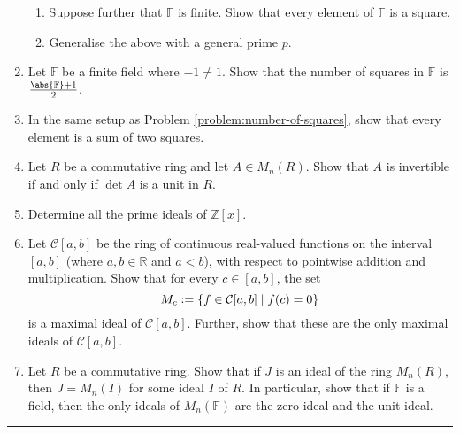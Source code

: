 \begin{enumerate}
\begin{enumerate}
        \item Suppose further that $\mathbb{F}$ is finite. Show that every element of $\mathbb{F}$ is a square.
        \item Generalise the above with a general prime $p$.
    \end{enumerate}
    \item \label{problem:number-of-squares}Let $\mathbb{F}$ be a finite field where $-1 \neq 1$. Show that the number of squares in $\mathbb{F}$ is $\frac{\abs{\mathbb{F}}+1}{2}$.
    \item In the same setup as Problem \ref{problem:number-of-squares}, show that every element is a sum of two squares.
    \item Let $R$ be a commutative ring and let $A \in M_n(R)$. Show that $A$ is invertible if and only if $\det A$ is a unit in $R$.
    \item Determine all the prime ideals of $\mathbb{Z}[x]$.
    \item Let $\mathcal{C}[a,b]$ be the ring of continuous real-valued functions on the interval $[a,b]$ (where $a,b \in \mathbb{R}$ and $a<b$), with respect to pointwise addition and multiplication. Show that for every $c \in [a,b]$, the set
    \[
        M_c \vcentcolon= \left\{ f \in \mathcal{C}[a,b] \mid f(c) = 0 \right\}
    \]
    is a maximal ideal of $\mathcal{C}[a,b]$. Further, show that these are the only maximal ideals of $\mathcal{C}[a,b]$.
    \item Let $R$ be a commutative ring. Show that if $J$ is an ideal of the ring $M_n(R)$, then $J = M_n(I)$ for some ideal $I$ of $R$. In particular, show that if $\mathbb{F}$ is a field, then the only ideals of $M_n(\mathbb{F})$ are the zero ideal and the unit ideal.
\end{enumerate}

\par\noindent\rule{\textwidth}{0.4pt}

